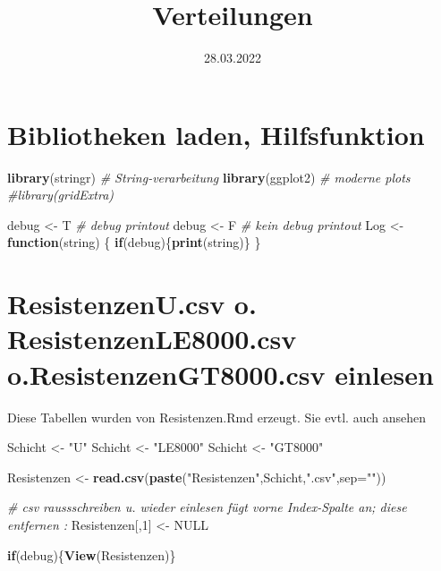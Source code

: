 \documentclass[
]{article}
\title{Verteilungen}
\author{}
\date{\vspace{-2.5em}28.03.2022}
\newenvironment{Shaded}{\begin{snugshade}}{\end{snugshade}}
\newcommand{\CommentTok}[1]{\textcolor[rgb]{0.56,0.35,0.01}{\textit{#1}}}
\newcommand{\ControlFlowTok}[1]{\textcolor[rgb]{0.13,0.29,0.53}{\textbf{#1}}}
\newcommand{\DataTypeTok}[1]{\textcolor[rgb]{0.13,0.29,0.53}{#1}}
\newcommand{\DecValTok}[1]{\textcolor[rgb]{0.00,0.00,0.81}{#1}}
\newcommand{\KeywordTok}[1]{\textcolor[rgb]{0.13,0.29,0.53}{\textbf{#1}}}
\newcommand{\NormalTok}[1]{#1}
\newcommand{\OtherTok}[1]{\textcolor[rgb]{0.56,0.35,0.01}{#1}}
\newcommand{\StringTok}[1]{\textcolor[rgb]{0.31,0.60,0.02}{#1}}
\begin{document}
\maketitle

\hypertarget{bibliotheken-laden-hilfsfunktion}{%
\section{Bibliotheken laden,
Hilfsfunktion}\label{bibliotheken-laden-hilfsfunktion}}

\begin{Shaded}
\begin{Highlighting}[]
\KeywordTok{library}\NormalTok{(stringr)    }\CommentTok{# String-verarbeitung}
\KeywordTok{library}\NormalTok{(ggplot2)    }\CommentTok{# moderne plots}
\CommentTok{#library(gridExtra)}

\NormalTok{debug <-}\StringTok{ }\NormalTok{T  }\CommentTok{# debug printout}
\NormalTok{debug <-}\StringTok{ }\NormalTok{F  }\CommentTok{# kein debug printout}
\NormalTok{Log <-}\StringTok{ }\ControlFlowTok{function}\NormalTok{(string) \{}
  \ControlFlowTok{if}\NormalTok{(debug)\{}\KeywordTok{print}\NormalTok{(string)\}  }
\NormalTok{\}}
\end{Highlighting}
\end{Shaded}

\hypertarget{resistenzenu.csv-o.-resistenzenle8000.csv-o.resistenzengt8000.csv-einlesen}{%
\section{ResistenzenU.csv o. ResistenzenLE8000.csv
o.ResistenzenGT8000.csv
einlesen}\label{resistenzenu.csv-o.-resistenzenle8000.csv-o.resistenzengt8000.csv-einlesen}}

Diese Tabellen wurden von Resistenzen.Rmd erzeugt. Sie evtl. auch
ansehen

\begin{Shaded}
\begin{Highlighting}[]
\NormalTok{Schicht <-}\StringTok{ "U"}
\NormalTok{Schicht <-}\StringTok{ "LE8000"}
\NormalTok{Schicht <-}\StringTok{ "GT8000"}

\NormalTok{Resistenzen <-}\StringTok{ }\KeywordTok{read.csv}\NormalTok{(}\KeywordTok{paste}\NormalTok{(}\StringTok{"Resistenzen"}\NormalTok{,Schicht,}\StringTok{".csv"}\NormalTok{,}\DataTypeTok{sep=}\StringTok{""}\NormalTok{))}

\CommentTok{# csv raussschreiben u. wieder einlesen fügt vorne Index-Spalte an; diese entfernen :}
\NormalTok{Resistenzen[,}\DecValTok{1}\NormalTok{] <-}\StringTok{ }\OtherTok{NULL}                      

\ControlFlowTok{if}\NormalTok{(debug)\{}\KeywordTok{View}\NormalTok{(Resistenzen)\}}
\end{Highlighting}
\end{Shaded}
\end{document}
